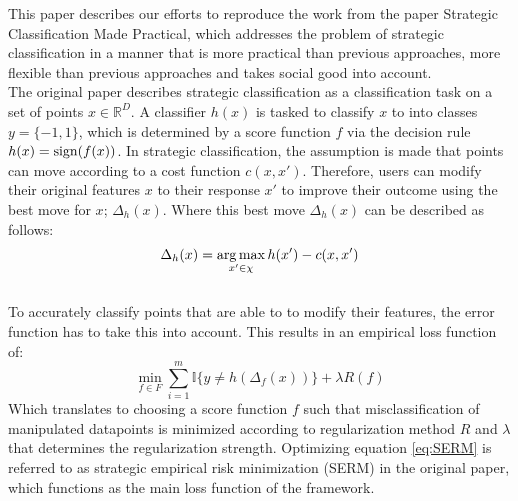 

This paper describes our efforts to reproduce the work from the paper Strategic Classification Made Practical\cite{levanon2021strategic}, which addresses the problem of strategic classification in a manner that is more practical than previous approaches, more flexible than previous approaches and takes social good into account.\\
The original paper describes strategic classification as a classification task on a set of points $x \in \mathbb{R}^D$. A classifier $h(x)$ is tasked to classify $x$ to into classes $y = \{-1,1\}$, which is determined by a score function $f$ via the decision rule $h(x) = \operatorname{sign}(f(x))$. In strategic classification, the assumption is made that points can move according to a cost function $c(x,x')$. Therefore, users can modify their original features $x$ to their response $x'$ to improve their outcome using the best move for $x$; $\Delta_{h}(x)$. Where this best move $\Delta_{h}(x)$ can be described as follows: 
\begin{equation} \label{eq:resp_map}
  \Delta_{h}(x) = \operatorname*{arg\,max}_{x' \in \chi} h(x') - c(x,x') 
\end{equation}\\
To accurately classify points that are able to to modify their features, the error function has to take this into account. This results in an empirical loss function of: 
\begin{equation} \label{eq:SERM}
 \min_{f \in F} \sum^{m}_{i=1} \mathds{I}\{y \neq h(\Delta_{f}(x))\} + \lambda R(f)
\end{equation}
Which translates to choosing a score function $f$ such that misclassification of manipulated datapoints is minimized according to regularization method $R$ and $\lambda$ that determines the regularization strength. Optimizing equation \ref{eq:SERM} is referred to as strategic empirical risk minimization (SERM) in the original paper, which functions as the main loss function of the framework.
